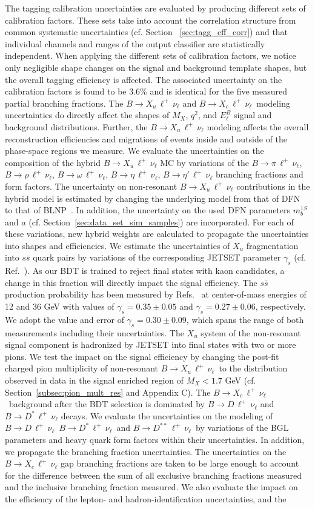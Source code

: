 \documentclass[twocolumn,aps,prd,superscriptaddress,nofootinbib,floatfix,preprintnumbers,a4]{revtex4-1}
\newcommand{\bulnu}{\ensuremath{B \to X_u \, \ell^+\, \nu_{\ell}}\xspace}
\newcommand{\bclnu}{\ensuremath{B \to X_c \, \ell^+\, \nu_{\ell}}\xspace}
\newcommand{\bpilnu}{\ensuremath{B \to \pi \, \ell^+\,\nu_{\ell}}\xspace}
\newcommand{\brholnu}{\ensuremath{B \to \rho \, \ell^+\,\nu_{\ell}}\xspace}
\newcommand{\bomegalnu}{\ensuremath{B \to \omega \, \ell^+\,\nu_{\ell}}\xspace}
\newcommand{\betalnu}{\ensuremath{B \to \eta \, \ell^+\,\nu_{\ell}}\xspace}
\newcommand{\betaplnu}{\ensuremath{B \to \eta' \, \ell^+\,\nu_{\ell}}\xspace}
\newcommand{\bdlnu}{\ensuremath{B \to D \, \ell^+\,\nu_{\ell}}\xspace}
\newcommand{\bdslnu}{\ensuremath{B \to D^* \, \ell^+\,\nu_{\ell}}\xspace}
\newcommand{\bddslnu}{\ensuremath{B \to D^{**} \, \ell^+\,\nu_{\ell}}\xspace}
\begin{document}
The tagging calibration uncertainties are evaluated by producing different sets of calibration factors. These sets take into account the correlation structure from common systematic uncertainties (cf. Section ~\ref{sec:tagg_eff_corr}) and that individual channels and ranges of the output classifier are statistically independent. When applying the different sets of calibration factors, we notice only negligible shape changes on the signal and background template shapes, but the overall tagging efficiency is affected. The associated uncertainty on the calibration factors is found to be 3.6\% and is identical for the five measured partial branching fractions. The \bulnu and \bclnu\ modeling uncertainties do directly affect the shapes of $M_X$, $q^2$, and $E_\ell^B$ signal and background distributions. Further, the \bulnu modeling affects the overall reconstruction efficiencies and migrations of events inside and outside of the phase-space regions we measure. We evaluate the uncertainties on the composition of the hybrid \bulnu MC by variations of the \bpilnu, \brholnu, \bomegalnu, \betalnu, \betaplnu branching fractions and form factors. The uncertainty on non-resonant \bulnu contributions in the hybrid model is estimated by changing the underlying model from that of DFN~\cite{DeFazio:1999ptt} to that of BLNP~\cite{BLNP}. In addition, the uncertainty on the used DFN parameters $m_b^{1S}$ and $a$ (cf. Section~\ref{sec:data_set_sim_samples}) are incorporated. For each of these variations, new hybrid weights are calculated to propagate the uncertainties into shapes and efficiencies. We estimate the uncertainties of $X_u$ fragmentation into $s \bar s$ quark pairs by variations of the corresponding JETSET parameter $\gamma_s$ (cf. Ref.~\cite{SJOSTRAND199474}). As our BDT is trained to reject final states with kaon candidates, a change in this fraction will directly impact the signal efficiency. The $s \bar s$ production probability has been measured by Refs.~\cite{Althoff:1984iz,Bartel:1983qp} at center-of-mass energies of 12 and 36 GeV with values of $\gamma_s = 0.35 \pm 0.05$ and $\gamma_s = 0.27 \pm 0.06$, respectively. We adopt the value and error of $\gamma_s = 0.30 \pm 0.09$, which spans the range of both measurements including their uncertainties. The $X_u$ system of the non-resonant signal component is hadronized by JETSET into final states with two or more pions. We test the impact on the signal efficiency by changing the post-fit charged pion multiplicity of non-resonant \bulnu\ to the distribution observed in data in the signal enriched region of $M_X < 1.7$ GeV (cf. Section~\ref{subsec:pion_mult_res} and Appendix C). The \bclnu\ background after the BDT selection is dominated by \bdlnu and \bdslnu decays. We evaluate the uncertainties on the modeling of \bdlnu\, \bdslnu\, and \bddslnu\ by variations of the BGL parameters and heavy quark form factors within their uncertainties. In addition, we propagate the branching fraction uncertainties. The uncertainties on the \bclnu gap branching fractions are taken to be large enough to account for the difference between the sum of all exclusive branching fractions measured and the inclusive branching fraction measured. We also evaluate the impact on the efficiency of the lepton- and hadron-identification uncertainties, and the 
\end{document}
